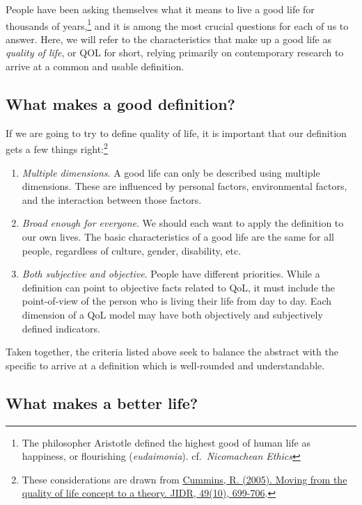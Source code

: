 \documentclass[
]{book}
\providecommand{\tightlist}{%
  \setlength{\itemsep}{0pt}\setlength{\parskip}{0pt}}
\begin{document}
People have been asking themselves what it means to live a good life for thousands of years,\footnote{The philosopher Aristotle defined the highest good of human life as happiness, or flourishing (\emph{eudaimonia}). cf.~\emph{Nicomachean Ethics}} and it is among the most crucial questions for each of us to answer. Here, we will refer to the characteristics that make up a good life as \emph{quality of life}, or QOL for short, relying primarily on contemporary research to arrive at a common and usable definition.

\hypertarget{what-makes-a-good-definition}{%
\subsection{What makes a good definition?}\label{what-makes-a-good-definition}}

If we are going to try to define quality of life, it is important that our definition gets a few things right:\footnote{These considerations are drawn from \href{https://www.ncbi.nlm.nih.gov/pubmed/16162114}{Cummins, R. (2005). Moving from the quality of life concept to a theory. JIDR, 49(10), 699-706}.}

\begin{enumerate}
\def\labelenumi{\arabic{enumi}.}
\tightlist
\item
  \emph{Multiple dimensions}. A good life can only be described using multiple dimensions. These are influenced by personal factors, environmental factors, and the interaction between those factors.
\item
  \emph{Broad enough for everyone}. We should each want to apply the definition to our own lives. The basic characteristics of a good life are the same for all people, regardless of culture, gender, disability, etc.
\item
  \emph{Both subjective and objective}. People have different priorities. While a definition can point to objective facts related to QoL, it must include the point-of-view of the person who is living their life from day to day. Each dimension of a QoL model may have both objectively and subjectively defined indicators.
\end{enumerate}

Taken together, the criteria listed above seek to balance the abstract with the specific to arrive at a definition which is well-rounded and understandable.

\hypertarget{what-makes-a-better-life}{%
\subsection{What makes a better life?}\label{what-makes-a-better-life}}
\end{document}
